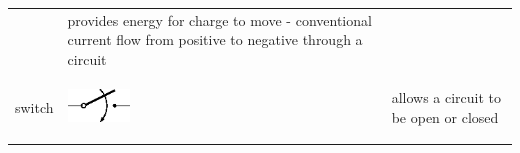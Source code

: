 \begin{center}
\begin{xtabular*}{\mytablewidth}[t]{|p{10\mystarwidth}|p{10\mystarwidth}|p{10\mystarwidth}|}
\begin{center}
    \end{center}



    \addtocounter{footnote}{-0}
    
                   &
    
    
        provides energy for charge to move - conventional current flow from positive to negative through a circuit%
     \tabularnewline{}
    
    
        switch &
    
    
        
                    
    \setcounter{subfigure}{0}

\label{m38516*id62966}
    \begin{center}
    \label{m38516*id62966!!!underscore!!!media}\label{m38516*id62966!!!underscore!!!printimage}\includegraphics[width=0.2\textwidth]{col11305.imgs/m38516_PG10C9_003.png} %
        
      \vspace{2pt}
    \vspace{.1in}
    
    \end{center}



    \addtocounter{footnote}{-0}
    
                   &
    
    
        allows a circuit to be open or closed%
     \tabularnewline{}
    

\end{xtabular*}
\end{center}
